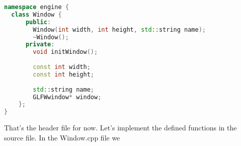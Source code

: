 \documentclass[12pt]{report} \usepackage{preamble}
\begin{document}
\begin{lstlisting}[language=C++, caption = {Window Class}]
namespace engine {
  class Window {
      public:
        Window(int width, int height, std::string name);
        ~Window();
      private:
        void initWindow();
      
        const int width;
        const int height;
      
        std::string name;
        GLFWwindow* window;
    };
}
\end{lstlisting}

That's the header file for now. Let's implement the defined functions in the source file.
In the Window.cpp file we 

\printbibliography[
	heading=bibintoc, title={Bibliography}
]

\listoffigures
\end{document}
